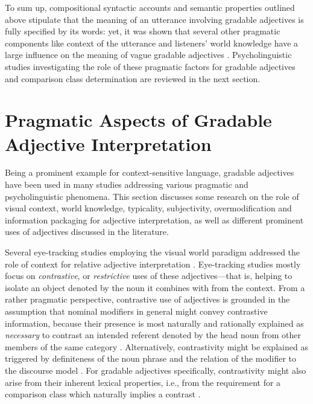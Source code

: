 To sum up, compositional syntactic accounts and semantic properties outlined above stipulate that the meaning of an utterance involving gradable adjectives is fully specified by its words: yet, it was shown that several other pragmatic components like context of the utterance and listeners’ world knowledge have a large influence on the meaning of vague gradable adjectives \parencite[e.g.,][]{tessler2017warm, Kennedy2007, sedivy1999}. Psycholinguistic studies investigating the role of these pragmatic factors for gradable adjectives and comparison class determination are reviewed in the next section. 
\section{Pragmatic Aspects of Gradable Adjective Interpretation}
\label{2.4.}
Being a prominent example for context-sensitive language, gradable adjectives have been used in many studies addressing various pragmatic and psycholinguistic phenomena. This section discusses some research on the role of visual context, world knowledge, typicality, subjectivity, overmodification and information packaging for adjective interpretation, as well as different prominent uses of adjectives discussed in the literature. %

Several eye-tracking studies employing the  visual world paradigm addressed the role of context for relative adjective interpretation \parencite[e.g.,][]{sedivy1999, Aparicio2016}.
Eye-tracking studies mostly focus on \textit{contrastive}, or \textit{restrictive} uses of these adjectives---that is, helping to isolate an object denoted by the noun it combines with from the context. From a rather pragmatic perspective, contrastive use of adjectives is grounded in the assumption that nominal modifiers in general might convey contrastive information, because their presence is most naturally and rationally explained as \emph{necessary} to contrast an intended referent denoted by the head noun from other members of the same category \parencite{sedivy1999, clifton1989ambiguity}. Alternatively, contrastivity might be explained as triggered by definiteness of the noun phrase and the relation of the modifier to the discourse model \parencite{sedivy1999, steedman1989ambiguity}. For gradable adjectives specifically, contrastivity might also arise from their inherent lexical properties, i.e., from the requirement for a comparison class which naturally implies a contrast \parencite{Bierwisch1989, sedivy1999}. 

